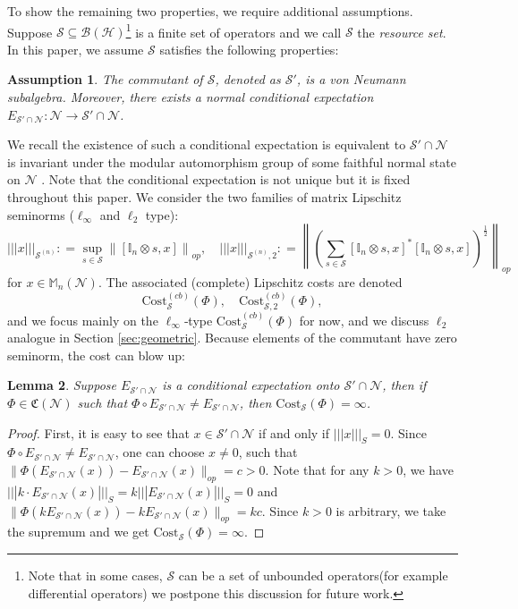 \documentclass[11pt,reqno]{amsart}
\numberwithin{equation}{section}
\newtheorem{lemma}{Lemma}[section]
\newtheorem{assumption}[lemma]{Assumption}
\newcommand{\mb}{\mathbb}
\newcommand{\mc}{\mathcal}
\newcommand{\Cost}{\mathrm{Cost}}
\begin{document}
To show the remaining two properties, we require additional assumptions. Suppose $\mc S \subseteq \mc B(\mc H)$\footnote{Note that in some cases, $\mc S$ can be a set of unbounded operators(for example differential operators) we postpone this discussion for future work. } is a finite set of operators and we call $\mc S$ the \textit{resource set}. In this paper, we assume $\mc S$ satisfies the following properties:
\begin{assumption}\label{assumption:resource}
The commutant of $\mc S$, denoted as $\mc S'$, is a von Neumann subalgebra. Moreover, there exists a normal conditional expectation $E_{\mc S' \cap \mc N}: \mc N \to \mc S' \cap \mc N$. 
\end{assumption}
We recall the existence of such a conditional expectation is equivalent to $\mc S' \cap \mc N$ is invariant under the modular automorphism
group of some faithful normal state on $\mc N$ \cite{dixmier2011neumann}. Note that the conditional expectation is not unique but it is fixed throughout this paper.
We consider the two families of matrix
Lipschitz seminorms ($\ell_{\infty}$ and $\ell_2$ type):
\begin{equation}\label{def: commutator seminorm}
    |||x|||_{\mc S^{(n)}} : = \sup_{s \in \mc S} \left\|[\mb I_n\otimes s,x]\right\|_{op}, \quad |||x|||_{\mc S^{(n)},2} : = \left\| \left(\sum_{s \in \mc S} [\mb I_n\otimes s,x]^* [\mb I_n\otimes s,x] \right)^{\frac{1}{2}}\right\|_{op}
\end{equation}
for $ x \in \mb M_n(\mc N)$. The associated (complete) Lipschitz costs are denoted
\begin{equation}
    \Cost^{(cb)}_{\mc S}(\Phi),\quad \Cost^{(cb)}_{\mc S,2}(\Phi),
\end{equation}
and we focus mainly on the $\ell_{\infty}$‑type $\Cost^{(cb)}_{\mathcal S}(\Phi)$ for now, and we discuss $\ell_{2}$ analogue in Section \ref{sec:geometric}. Because elements of the commutant have zero seminorm, the cost can
blow up:
\begin{lemma}
    Suppose $E_{\mc S'\cap \mc N}$ is a conditional expectation onto $\mc S'\cap \mc N$, then if $\Phi \in \mathfrak{C}(\mc N)$ such that $\Phi \circ E_{\mc S'\cap \mc N} \neq E_{\mc S'\cap \mc N}$, then $\Cost_{\mc S}(\Phi) = \infty$.
\end{lemma}
\begin{proof}
    First, it is easy to see that $x \in \mc S'\cap \mc N$ if and only if $|||x|||_S = 0$. Since $\Phi \circ E_{\mc S'\cap \mc N} \neq E_{\mc S'\cap \mc N}$, one can choose $x \neq 0$, such that $\|\Phi(E_{\mc S'\cap \mc N}(x)) - E_{\mc S'\cap \mc N}(x)\|_{op} = c >0$. Note that for any $k>0$, we have $|||k \cdot E_{\mc S'\cap \mc N}(x)|||_S = k|||E_{\mc S'\cap \mc N}(x)|||_S = 0$ and $\|\Phi(k E_{\mc S'\cap \mc N}(x)) - k E_{\mc S'\cap \mc N}(x)\|_{op} = kc$. Since $k>0$ is arbitrary, we take the supremum and we get $\Cost_{\mc S}(\Phi) = \infty$. 
\end{proof}
\end{document}
